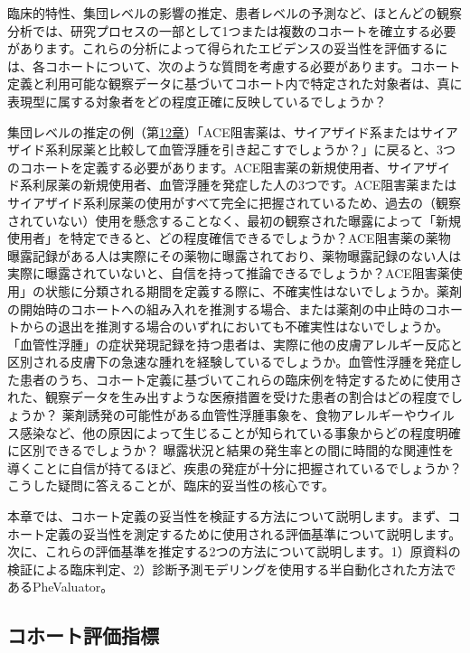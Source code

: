 \documentclass[
  11pt]{book}
\theoremstyle{definition}
\theoremstyle{definition}
\theoremstyle{definition}
\theoremstyle{definition}
\theoremstyle{remark}
\begin{document}
臨床的特性、集団レベルの影響の推定、患者レベルの予測など、ほとんどの観察分析では、研究プロセスの一部として1つまたは複数のコホートを確立する必要があります。これらの分析によって得られたエビデンスの妥当性を評価するには、各コホートについて、次のような質問を考慮する必要があります。コホート定義と利用可能な観察データに基づいてコホート内で特定された対象者は、真に表現型に属する対象者をどの程度正確に反映しているでしょうか？

集団レベルの推定の例（第\href{https://ohdsi.github.io/TheBookOfOhdsi/PopulationLevelEstimation.html\#PopulationLevelEstimation}{12章}）「ACE阻害薬は、サイアザイド系またはサイアザイド系利尿薬と比較して血管浮腫を引き起こすでしょうか？」に戻ると、3つのコホートを定義する必要があります。ACE阻害薬の新規使用者、サイアザイド系利尿薬の新規使用者、血管浮腫を発症した人の3つです。ACE阻害薬またはサイアザイド系利尿薬の使用がすべて完全に把握されているため、過去の（観察されていない）使用を懸念することなく、最初の観察された曝露によって「新規使用者」を特定できると、どの程度確信できるでしょうか？ACE阻害薬の薬物曝露記録がある人は実際にその薬物に曝露されており、薬物曝露記録のない人は実際に曝露されていないと、自信を持って推論できるでしょうか？ACE阻害薬使用」の状態に分類される期間を定義する際に、不確実性はないでしょうか。薬剤の開始時のコホートへの組み入れを推測する場合、または薬剤の中止時のコホートからの退出を推測する場合のいずれにおいても不確実性はないでしょうか。「血管性浮腫」の症状発現記録を持つ患者は、実際に他の皮膚アレルギー反応と区別される皮膚下の急速な腫れを経験しているでしょうか。血管性浮腫を発症した患者のうち、コホート定義に基づいてこれらの臨床例を特定するために使用された、観察データを生み出すような医療措置を受けた患者の割合はどの程度でしょうか？ 薬剤誘発の可能性がある血管性浮腫事象を、食物アレルギーやウイルス感染など、他の原因によって生じることが知られている事象からどの程度明確に区別できるでしょうか？ 曝露状況と結果の発生率との間に時間的な関連性を導くことに自信が持てるほど、疾患の発症が十分に把握されているでしょうか？こうした疑問に答えることが、臨床的妥当性の核心です。

本章では、コホート定義の妥当性を検証する方法について説明します。まず、コホート定義の妥当性を測定するために使用される評価基準について説明します。次に、これらの評価基準を推定する2つの方法について説明します。1）原資料の検証による臨床判定、2）診断予測モデリングを使用する半自動化された方法であるPheValuator。

\subsection{コホート評価指標}\label{ux30b3ux30dbux30fcux30c8ux8a55ux4fa1ux6307ux6a19}
\end{document}
